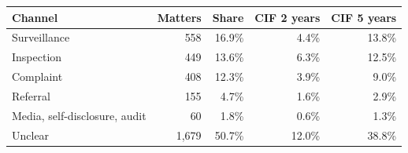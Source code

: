 \begin{tabular*}{\textwidth}[]{l@{\extracolsep\fill}rrrr}
\toprule
Channel & Matters & Share & CIF 2 years & CIF 5 years\\
\midrule
Surveillance & 558 & 16.9\% & 4.4\% & 13.8\%\\
Inspection & 449 & 13.6\% & 6.3\% & 12.5\%\\
Complaint & 408 & 12.3\% & 3.9\% & 9.0\%\\
Referral & 155 & 4.7\% & 1.6\% & 2.9\%\\
Media, self-disclosure, audit & 60 & 1.8\% & 0.6\% & 1.3\%\\
Unclear & 1,679 & 50.7\% & 12.0\% & 38.8\%\\
\bottomrule
\end{tabular*}
